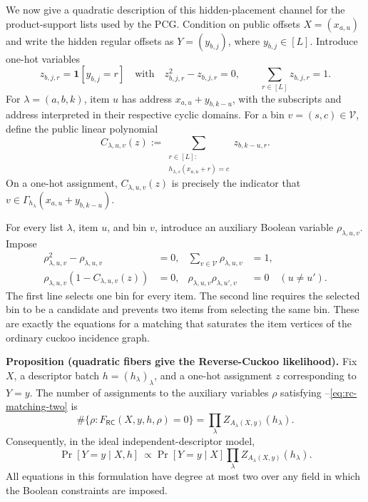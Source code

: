 We now give a quadratic description of this hidden-placement channel for the
product-support lists used by the PCG.  Condition on public offsets
$X=(x_{a,u})$ and write the hidden regular offsets as
$Y=(y_{b,j})$, where $y_{b,j}\in[L]$.  Introduce one-hot variables
\[
 z_{b,j,r}=\mathbf 1[y_{b,j}=r]
 \quad\text{with}\quad
 z_{b,j,r}^2-z_{b,j,r}=0,
 \qquad \sum_{r\in[L]}z_{b,j,r}=1.
 \tag{RC-S}
\]
For $\lambda=(a,b,k)$, item $u$ has address
$x_{a,u}+y_{b,k-u}$, with the subscripts and address interpreted in their
respective cyclic domains.  For a bin $v=(s,c)\in\mathcal V$, define the
public linear polynomial
\[
 C_{\lambda,u,v}(z)
 :=\sum_{\substack{r\in[L]:\\
          h_{\lambda,s}(x_{a,u}+r)=c}}
       z_{b,k-u,r}.
 \tag{RC-I}
\]
On a one-hot assignment, $C_{\lambda,u,v}(z)$ is precisely the indicator that
$v\in\Gamma_{h_\lambda}(x_{a,u}+y_{b,k-u})$.

For every list $\lambda$, item $u$, and bin $v$, introduce an auxiliary
Boolean variable $\rho_{\lambda,u,v}$.  Impose
\begin{align}
 \rho_{\lambda,u,v}^2-\rho_{\lambda,u,v}&=0,
 &\sum_{v\in\mathcal V}\rho_{\lambda,u,v}&=1,
 \tag{RC-M1}\label{eq:rc-matching-one}\\
 \rho_{\lambda,u,v}(1-C_{\lambda,u,v}(z))&=0,
 &\rho_{\lambda,u,v}\rho_{\lambda,u',v}&=0
 \quad (u\ne u').
 \tag{RC-M2}\label{eq:rc-matching-two}
\end{align}
The first line selects one bin for every item.  The second line requires the
selected bin to be a candidate and prevents two items from selecting the same
bin.  These are exactly the equations for a matching that saturates the item
vertices of the ordinary cuckoo incidence graph.

\medskip
\noindent\textbf{Proposition (quadratic fibers give the Reverse-Cuckoo
likelihood).}
Fix $X$, a descriptor batch $h=(h_\lambda)_\lambda$, and a one-hot assignment
$z$ corresponding to $Y=y$.  The number of assignments to the auxiliary
variables $\rho$ satisfying
--\eqref{eq:rc-matching-two} is
\[
 \#\{\rho:F_{\mathsf{RC}}(X,y,h,\rho)=0\}
   =\prod_\lambda Z_{A_\lambda(X,y)}(h_\lambda).
 \tag{RC-F}\label{eq:rc-quadratic-fiber}
\]
Consequently, in the ideal independent-descriptor model,
\[
 \Pr[Y=y\mid X,h]
 \ \propto
 \Pr[Y=y\mid X]
 \prod_\lambda Z_{A_\lambda(X,y)}(h_\lambda).
 \tag{RC-P}\label{eq:rc-hidden-posterior}
\]
All equations in this formulation have degree at most two over any field in
which the Boolean constraints are imposed.

